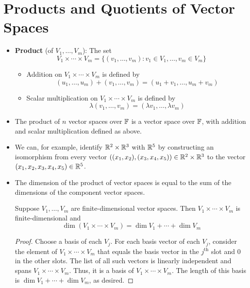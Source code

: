 \documentclass[../main.tex]{subfiles}
\begin{document}
\section{Products and Quotients of Vector Spaces}
\begin{itemize}
    \item \textbf{Product} (of $V_1,\dots,V_m$): The set
    \begin{equation*}
        V_1\times\cdots\times V_m = \{(v_1,\dots,v_m):v_1\in V_1,\dots,v_m\in V_m\}
    \end{equation*}
    \begin{itemize}
        \item Addition on $V_1\times\cdots\times V_m$ is defined by
        \begin{equation*}
            (u_1,\dots,u_m)+(v_1,\dots,v_m) = (u_1+v_1,\dots,u_m+v_m)
        \end{equation*}
        \item Scalar multiplication on $V_1\times\cdots\times V_m$ is defined by
        \begin{equation*}
            \lambda(v_1,\dots,v_m) = (\lambda v_1,\dots,\lambda v_m)
        \end{equation*}
    \end{itemize}
    \item The product of $n$ vector spaces over $\mathbb{F}$ is a vector space over $\mathbb{F}$, with addition and scalar multiplication defined as above.
    \item We can, for example, identify $\mathbb{R}^2\times\mathbb{R}^3$ with $\mathbb{R}^5$ by constructing an isomorphism from every vector $((x_1,x_2),(x_3,x_4,x_5))\in\mathbb{R}^2\times\mathbb{R}^3$ to the vector $(x_1,x_2,x_3,x_4,x_5)\in\mathbb{R}^5$.
    \item The dimension of the product of vector spaces is equal to the sum of the dimensions of the component vector spaces.
    \begin{theorem}\label{trm:dimensionProduct}
        Suppose $V_1,\dots,V_m$ are finite-dimensional vector spaces. Then $V_1\times\cdots\times V_m$ is finite-dimensional and
        \begin{equation*}
            \dim(V_1\times\cdots\times V_m) = \dim V_1+\cdots+\dim V_m
        \end{equation*}
        \begin{proof}
            Choose a basis of each $V_j$. For each basis vector of each $V_j$, consider the element of $V_1\times\cdots\times V_m$ that equals the basis vector in the $j^\text{th}$ slot and 0 in the other slots. The list of all such vectors is linearly independent and spans $V_1\times\cdots\times V_m$. Thus, it is a basis of $V_1\times\cdots\times V_m$. The length of this basis is $\dim V_1+\cdots+\dim V_m$, as desired.

\end{proof}
\end{theorem}
\end{itemize}
\end{document}

